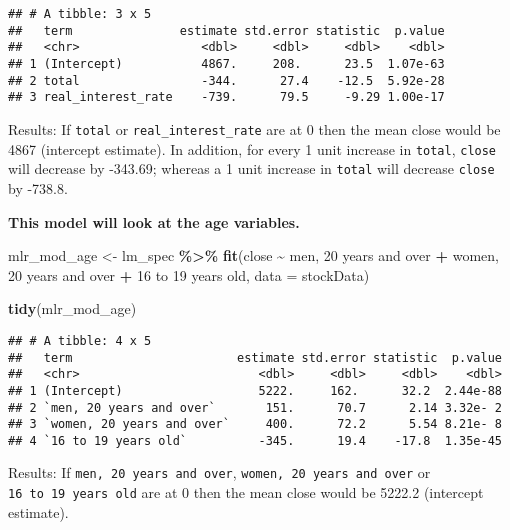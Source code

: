 \documentclass[
]{article}
\newenvironment{Shaded}{\begin{snugshade}}{\end{snugshade}}
\newcommand{\AttributeTok}[1]{\textcolor[rgb]{0.13,0.29,0.53}{#1}}
\newcommand{\FunctionTok}[1]{\textcolor[rgb]{0.13,0.29,0.53}{\textbf{#1}}}
\newcommand{\NormalTok}[1]{#1}
\newcommand{\OtherTok}[1]{\textcolor[rgb]{0.56,0.35,0.01}{#1}}
\newcommand{\SpecialCharTok}[1]{\textcolor[rgb]{0.81,0.36,0.00}{\textbf{#1}}}
\newcommand{\StringTok}[1]{\textcolor[rgb]{0.31,0.60,0.02}{#1}}
\begin{document}
\begin{verbatim}
## # A tibble: 3 x 5
##   term               estimate std.error statistic  p.value
##   <chr>                 <dbl>     <dbl>     <dbl>    <dbl>
## 1 (Intercept)           4867.     208.      23.5  1.07e-63
## 2 total                 -344.      27.4    -12.5  5.92e-28
## 3 real_interest_rate    -739.      79.5     -9.29 1.00e-17
\end{verbatim}

Results: If \texttt{total} or \texttt{real\_interest\_rate} are at 0
then the mean close would be 4867 (intercept estimate). In addition, for
every 1 unit increase in \texttt{total}, \texttt{close} will decrease by
-343.69; whereas a 1 unit increase in \texttt{total} will decrease
\texttt{close} by -738.8.

\textbf{This model will look at the age variables.}

\begin{Shaded}
\begin{Highlighting}[]
\NormalTok{mlr\_mod\_age }\OtherTok{\textless{}{-}}\NormalTok{ lm\_spec }\SpecialCharTok{\%\textgreater{}\%} 
  \FunctionTok{fit}\NormalTok{(close }\SpecialCharTok{\textasciitilde{}} \StringTok{\textasciigrave{}}\AttributeTok{men, 20 years and over}\StringTok{\textasciigrave{}} \SpecialCharTok{+} \StringTok{\textasciigrave{}}\AttributeTok{women, 20 years and over}\StringTok{\textasciigrave{}} \SpecialCharTok{+} \StringTok{\textasciigrave{}}\AttributeTok{16 to 19 years old}\StringTok{\textasciigrave{}}\NormalTok{, }\AttributeTok{data =}\NormalTok{ stockData)}

\FunctionTok{tidy}\NormalTok{(mlr\_mod\_age)}
\end{Highlighting}
\end{Shaded}

\begin{verbatim}
## # A tibble: 4 x 5
##   term                       estimate std.error statistic  p.value
##   <chr>                         <dbl>     <dbl>     <dbl>    <dbl>
## 1 (Intercept)                   5222.     162.      32.2  2.44e-88
## 2 `men, 20 years and over`       151.      70.7      2.14 3.32e- 2
## 3 `women, 20 years and over`     400.      72.2      5.54 8.21e- 8
## 4 `16 to 19 years old`          -345.      19.4    -17.8  1.35e-45
\end{verbatim}

Results: If \texttt{men,\ 20\ years\ and\ over},
\texttt{women,\ 20\ years\ and\ over} or \texttt{16\ to\ 19\ years\ old}
are at 0 then the mean close would be 5222.2 (intercept estimate).
\end{document}
